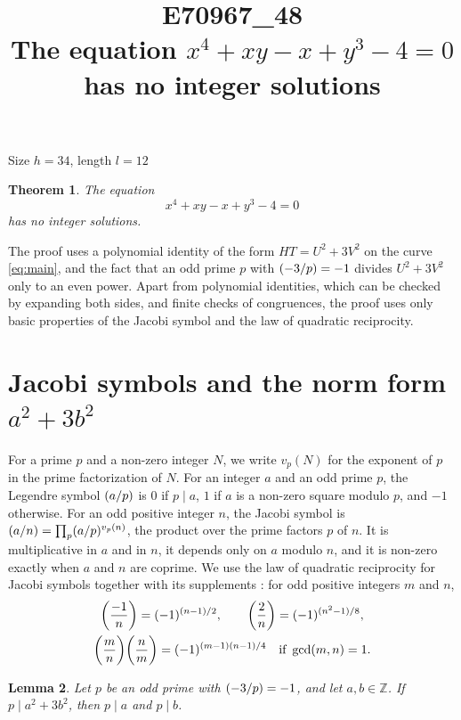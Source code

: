 \documentclass[11pt]{article}
\title{\textbf{E70967\_48}\\[4pt] {\Large The equation $x^{4}+xy-x+y^{3}-4=0$ has no integer solutions}}
\author{}
\date{}
\newtheorem{theorem}{Theorem}
\newtheorem{lemma}[theorem]{Lemma}
\newcommand{\Z}{\mathbb{Z}}
\newcommand{\leg}[2]{\mathchoice{\biggl(\dfrac{#1}{#2}\biggr)}{(#1/#2)}{(#1/#2)}{(#1/#2)}}
\begin{document}
\maketitle
\vspace{-8ex}
\begin{center}
Size $h=34$, length $l=12$
\end{center}

\begin{theorem}\label{thm:main}
The equation
\begin{equation}\label{eq:main}
x^{4}+xy-x+y^{3}-4=0
\end{equation}
has no integer solutions.
\end{theorem}

The proof uses a polynomial identity of the form $HT=U^2+3V^2$ on the curve \eqref{eq:main}, and the fact that an odd prime $p$ with $\leg{-3}{p}=-1$ divides $U^2+3V^2$ only to an even power. Apart from polynomial identities, which can be checked by expanding both sides, and finite checks of congruences, the proof uses only basic properties of the Jacobi symbol and the law of quadratic reciprocity.

\section{\texorpdfstring{Jacobi symbols and the norm form $a^2+3b^2$}{Jacobi symbols and the norm form}}

For a prime $p$ and a non-zero integer $N$, we write $v_p(N)$ for the exponent of $p$ in the prime factorization of $N$. For an integer $a$ and an odd prime $p$, the Legendre symbol $\leg{a}{p}$ is $0$ if $p\mid a$, $1$ if $a$ is a non-zero square modulo $p$, and $-1$ otherwise. For an odd positive integer $n$, the Jacobi symbol is $\leg{a}{n}=\prod_p\leg{a}{p}^{v_p(n)}$, the product over the prime factors $p$ of $n$. It is multiplicative in $a$ and in $n$, it depends only on $a$ modulo $n$, and it is non-zero exactly when $a$ and $n$ are coprime. We use the law of quadratic reciprocity for Jacobi symbols together with its supplements \cite[Chapter~5, \S2]{IR}: for odd positive integers $m$ and $n$,
\begin{gather*}
\leg{-1}{n}=(-1)^{(n-1)/2},\qquad\leg{2}{n}=(-1)^{(n^2-1)/8},\\
\leg{m}{n}\leg{n}{m}=(-1)^{(m-1)(n-1)/4}\quad\text{if }\gcd(m,n)=1.
\end{gather*}

\begin{lemma}\label{lem:divides}
Let $p$ be an odd prime with $\leg{-3}{p}=-1$, and let $a,b\in\Z$. If $p\mid a^2+3b^2$, then $p\mid a$ and $p\mid b$.
\end{lemma}
\end{document}
